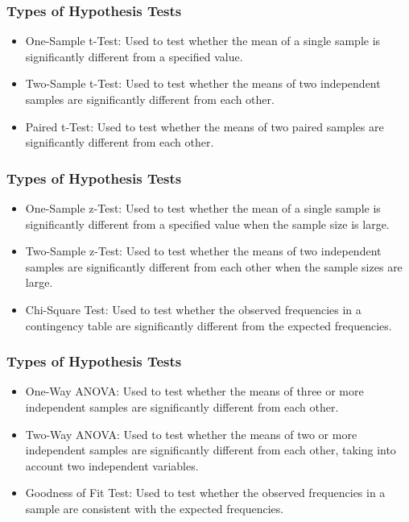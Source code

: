 \documentclass[serif, 9pt, aspectratio=32]{beamer}
\begin{document}
\begin{frame}
    \frametitle{Types of Hypothesis Tests}
    \begin{itemize}
        \setlength{\itemsep}{2em}
        \item One-Sample t-Test: Used to test whether the mean of a single sample is significantly different from a specified value.
        \item Two-Sample t-Test: Used to test whether the means of two independent samples are significantly different from each other.
        \item Paired t-Test: Used to test whether the means of two paired samples are significantly different from each other.
    \end{itemize}
\end{frame}

\begin{frame}
    \frametitle{Types of Hypothesis Tests}
    \begin{itemize}
        \setlength{\itemsep}{2em}
        \item One-Sample z-Test: Used to test whether the mean of a single sample is significantly different from a specified value when the sample size is large.
        \item Two-Sample z-Test: Used to test whether the means of two independent samples are significantly different from each other when the sample sizes are large.
        \item Chi-Square Test: Used to test whether the observed frequencies in a contingency table are significantly different from the expected frequencies.
    \end{itemize}
\end{frame}

\begin{frame}
    \frametitle{Types of Hypothesis Tests}
    \begin{itemize}
        \setlength{\itemsep}{2em}
        \item One-Way ANOVA: Used to test whether the means of three or more independent samples are significantly different from each other.
        \item Two-Way ANOVA: Used to test whether the means of two or more independent samples are significantly different from each other, taking into account two independent variables.
        \item Goodness of Fit Test: Used to test whether the observed frequencies in a sample are consistent with the expected frequencies.
    \end{itemize}
\end{frame}
\end{document}
